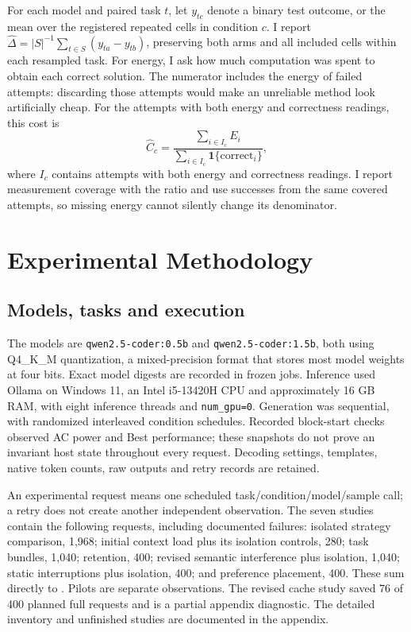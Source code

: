 \documentclass[10pt,a4paper,twocolumn]{article}
\begin{document}
For each model and paired task $t$, let $y_{tc}$ denote a binary test outcome,
or the mean over the registered repeated cells in condition $c$. I report
$\widehat\Delta=|S|^{-1}\sum_{t\in S}(y_{ta}-y_{tb})$, preserving both arms
and all included cells within each resampled task. For energy, I ask how much computation was spent to obtain each correct
solution. The numerator includes the energy of failed attempts: discarding
those attempts would make an unreliable method look artificially cheap. For
the attempts with both energy and correctness readings, this cost is
\begin{equation}
\widehat C_c=\frac{\sum_{i\in I_c}E_i}{\sum_{i\in I_c}\mathbf{1}\{\text{correct}_i\}},
\end{equation}
where $I_c$ contains attempts with both energy and correctness readings. I report measurement coverage with the ratio and use successes from the same
covered attempts, so missing energy cannot silently change its denominator.

\section{Experimental Methodology}
\subsection{Models, tasks and execution}
The models are \texttt{qwen2.5-coder:0.5b} and
\texttt{qwen2.5-coder:1.5b}, both using Q4\_K\_M quantization, a mixed-precision format that stores most
model weights at four bits. Exact model digests are recorded in frozen jobs. Inference used Ollama on Windows 11, an Intel
i5-13420H CPU and approximately 16 GB RAM, with eight inference threads and
\texttt{num\_gpu=0}. Generation was sequential, with randomized interleaved
condition schedules. Recorded block-start checks observed AC power and Best
performance; these snapshots do not prove an invariant host state throughout
every request. Decoding settings, templates, native token counts, raw outputs
and retry records are retained.

An experimental request means one scheduled task/condition/model/sample call;
a retry does not create another independent observation. The seven studies
contain the following requests, including documented failures: isolated strategy comparison, 1,968; initial
context load plus its isolation controls, 280; task bundles, 1,040; retention,
400; revised semantic interference plus isolation, 1,040; static interruptions
plus isolation, 400; and preference placement, 400. These sum directly to
\MainRequests{}. Pilots are separate observations. The revised cache study
saved 76 of 400 planned full requests and is a partial appendix diagnostic.
The detailed inventory and unfinished studies are documented in the appendix.
\end{document}
